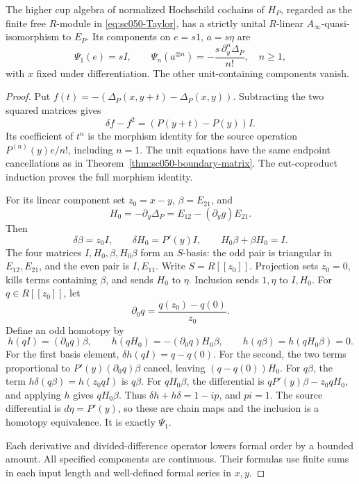 \begin{proposition}\label{prop:sc050-HH-diagonal}
The higher cup algebra of normalized Hochschild cochains of
\(H_P\), regarded as the finite free \(R\)-module in
\eqref{eq:sc050-Taylor}, has a strictly unital \(R\)-linear
\(A_\infty\)-quasi-isomorphism to \(E_P\).
Its components on \(e=s1\), \(a=s\eta\) are
\[
 \Psi_1(e)=sI,\qquad
 \Psi_n(a^{\otimes n})
      =-\frac{s\,\partial_y^n\Delta_P}{n!},\quad n\ge1,
\]
with \(x\) fixed under differentiation. The other
unit-containing components vanish.
\end{proposition}
\begin{proof}
Put \(f(t)=-(\Delta_P(x,y+t)-\Delta_P(x,y))\).
Subtracting the two squared matrices gives
\[
 \delta f-f^2=(P(y+t)-P(y))I.
\]
Its coefficient of \(t^n\) is the morphism identity for the
source operation \(P^{(n)}(y)e/n!\), including \(n=1\).
The unit equations have the same endpoint cancellations as
in Theorem~\ref{thm:sc050-boundary-matrix}. The cut-coproduct
induction proves the full morphism identity.

For its linear component set \(z_0=x-y\),
\(\beta=E_{21}\), and
\[
 H_0=-\partial_y\Delta_P=E_{12}-(\partial_yg)E_{21}.
\]
Then
\[
 \delta\beta=z_0I,\qquad \delta H_0=P'(y)I,\qquad
 H_0\beta+\beta H_0=I.
\]
The four matrices \(I,H_0,\beta,H_0\beta\) form an \(S\)-basis:
the odd pair is triangular in \(E_{12},E_{21}\), and the
even pair is \(I,E_{11}\).
Write \(S=R[[z_0]]\). Projection sets \(z_0=0\), kills terms
containing \(\beta\), and sends \(H_0\) to \(\eta\).
Inclusion sends \(1,\eta\) to \(I,H_0\).
For \(q\in R[[z_0]]\), let
\[
 \partial_0q=\frac{q(z_0)-q(0)}{z_0}.
\]
Define an odd homotopy by
\[
 h(qI)=(\partial_0q)\beta,\qquad
 h(qH_0)=-(\partial_0q)H_0\beta,\qquad
 h(q\beta)=h(qH_0\beta)=0.
\]
For the first basis element, \(\delta h(qI)=q-q(0)\).
For the second, the two terms proportional to
\(P'(y)(\partial_0q)\beta\) cancel, leaving
\((q-q(0))H_0\).
For \(q\beta\), the term \(h\delta(q\beta)=h(z_0qI)\)
is \(q\beta\).
For \(qH_0\beta\), the differential is
\(qP'(y)\beta-z_0qH_0\), and applying \(h\) gives
\(qH_0\beta\).
Thus \(\delta h+h\delta=1-ip\), and \(pi=1\).
The source differential is \(d\eta=P'(y)\), so these are
chain maps and the inclusion is a homotopy equivalence.
It is exactly \(\Psi_1\).

Each derivative and divided-difference operator lowers formal
order by a bounded amount. All specified components are
continuous. Their formulas use finite sums in each input
length and well-defined formal series in \(x,y\).
\end{proof}

